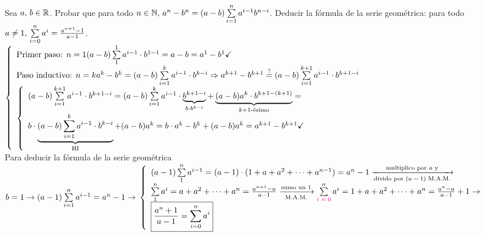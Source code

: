 \documentclass[12pt,a4paper, spanish]{article}
\begin{document}
\ejercicio
Sea $a,\, b \in \mathbb R$. Probar que para todo $n \in \mathbb N,\, a^n - b^n = (a-b) \sum\limits_{i = 1}^{n}a^{i-1}b^{n-i}$. Deducir la fórmula de la serie
geométrica: para todo $a \neq 1,\, \sum\limits_{i = 0}^{n}a^i = \frac{a^{n+1} - 1}{a-1}$.\\
$\llave{ l }{
		\text{Primer paso: } n = 1 (a-b) \sumatoria{1}{1} a^{i-1} \cdot b^{1-1} = a - b = a^1 - b^1 \checkmark\\
		\text{Paso inductivo: } n = k  a^k - b^k = (a-b) \sumatoria{i = 1}{k} a^{i-1} \cdot b^{k-i} \entonces
		a^{k+1} - b^{k+1} \eq?= (a-b) \sumatoria{i = 1}{k+1} a^{i-1} \cdot b^{k+1-i}\\
		\llave{l}{
			(a-b) \sumatoria{i = 1}{k+1} a^{i-1} \cdot b^{k+1-i} =
			(a-b) \sumatoria{i = 1}{k} a^{i-1} \cdot \underbrace{b^{k+1-i}}_{b\cdot b^{k-i}} + \kmasuno{(a - b) a^k \cdot b^{k+1-(k+1)}} = \\
			b \cdot \HI{(a-b) \sumatoria{i = 1}{k} a^{i-1} \cdot b^{k-i}} + (a - b) a^k = b \cdot a^k - b^k + (a - b) a^k = a^{k+1} - b^{k+1}\checkmark
		}\\
	}$\\
Para deducir la fórmula de la serie geométrica $b = 1 \to (a-1) \sumatoria{i=1}{n} a^{i-1} = a^n - 1 \to\\
	\llave{ l }{
		(a-1) \sumatoria{1}{n} a^{i-1} =(a-1) \cdot (1 + a + a^2 + \cdots + a^{n-1})  = a^n - 1 \flecha{multiplico por $a$ y}[divido por $(a - 1)$ M.A.M.]\\
		\sumatoria{1}{n} a^i = a + a^2 + \cdots + a^n  = \frac{a^{n+1} - a}{a-1} \flecha{sumo un $1$}[M.A.M.]
		\sumatoria{\magenta{$i = 0$}}{n} a^i = 1 + a + a^2 + \cdots + a^n   = \frac{a^n - a}{a-1} + 1 \to\\
		\boxed{ \frac{a^n + 1}{a-1} =  \sumatoria{i = 0}{n} a^i  }
	}$

\ejercicio

\ejercicio

\ejercicio

\ejercicio

\ejercicio
\end{document}
